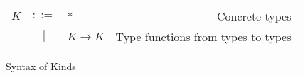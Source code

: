 \begin{figure}[H]\label{fig:kinds}
    \centering
    \begin{tabular}{l c p{3cm} r}
        $ K $ & $ ::= $ & * &                   Concrete types \\
      & $ | $ & $ K \rightarrow K $ &           Type functions from types to types \\
    \end{tabular}
    \caption{Syntax of Kinds}
\end{figure}

% 
% 
% 
% 
% 
% 
% 
% 
% 
% 
% 
% 
% 

